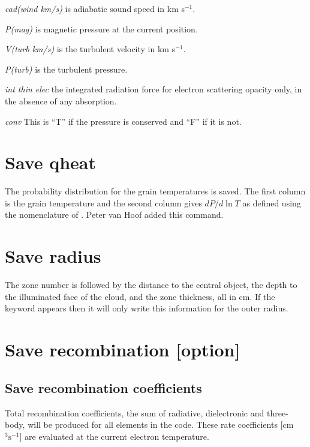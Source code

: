 \begin{description}
\item  \emph{cad(wind km/s)} is adiabatic sound speed in km s$^{-1}$.

\item \emph{P(mag)} is magnetic pressure at the current position.

\item \emph{V(turb km/s)} is the turbulent velocity in km s$^{-1}$.

\item \emph{P(turb)} is the turbulent pressure.

\item \emph{int thin elec} the integrated radiation force
for electron scattering opacity only, in the absence of
any absorption.

\item  \emph{conv} This is ``T'' if the pressure is conserved and ``F'' if it is not.
\end{description}

\section{Save qheat}

The probability distribution for the grain temperatures is saved.
The first column is the grain temperature and the second column gives
$dP/d\ln T$ as defined using the nomenclature of \citet{Guhathakurta1989}.
Peter van Hoof added this command.

\section{Save radius}

The zone number is followed by the distance to the central object, the
depth to the illuminated face of the cloud, and the zone thickness, all
in cm.  If the keyword  appears then it will only write this information
for the outer radius.

\section{Save recombination [option]}

\subsection{Save recombination coefficients}

Total recombination coefficients, the sum of radiative, dielectronic
and three-body, will be produced for all elements in the code.  These rate
coefficients [cm$^3 \mathrm{s}^{-1}$] are evaluated at the current electron temperature.

